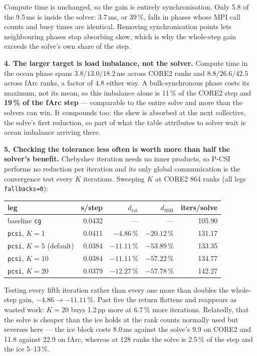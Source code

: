 \documentclass[10pt,a4paper]{article}
\begin{document}
\noindent
Compute time is unchanged, so the gain is entirely synchronisation. Only 5.8 of the 9.5\,ms
is inside the solver: 3.7\,ms, or 39\,\%, falls in phases whose MPI call counts and busy times
are identical. Removing synchronisation points lets neighbouring phases stop absorbing skew,
which is why the whole-step gain exceeds the solve's own share of the step.

\textbf{4. The larger target is load imbalance, not the solver.} Compute time in the ocean
phase spans $3.8/13.0/18.2$\,ms across CORE2 ranks and $8.8/26.6/42.5$ across fArc ranks, a
factor of $4.8$ either way. A bulk-synchronous phase costs its maximum, not its mean, so this
imbalance alone is 11\,\% of the CORE2 step and \textbf{19\,\% of the fArc step} --- comparable
to the entire solve and more than the solvers can win. It compounds too: the skew is absorbed
at the next collective, the solve's first reduction, so part of what the table attributes to
solver wait is ocean imbalance arriving there.

\textbf{5. Checking the tolerance less often is worth more than half the solver's benefit.}
Chebyshev iteration needs no inner products, so P-CSI performs no reduction per iteration and
its only global communication is the convergence test every $K$ iterations. Sweeping $K$ at
CORE2 864 ranks (all legs \texttt{fallbacks=0}):

\begin{center}\vspace{-5pt}\footnotesize
\begin{tabular}{lrrrr}
\toprule
leg & s/step & $d_{\mathrm{tot}}$ & $d_{\mathrm{SSH}}$ & iters/solve \\
\midrule
baseline \texttt{cg} & 0.0432 & --- & --- & 105.90 \\
\texttt{pcsi}, $K=1$  & 0.0411 & $-4.86$\,\% & $-20.12$\,\% & 131.17 \\
\texttt{pcsi}, $K=5$ (default) & 0.0384 & $\mathbf{-11.11}$\,\% & $-53.89$\,\% & 133.35 \\
\texttt{pcsi}, $K=10$ & 0.0384 & $-11.11$\,\% & $-57.22$\,\% & 134.77 \\
\texttt{pcsi}, $K=20$ & 0.0379 & $-12.27$\,\% & $-57.78$\,\% & 142.27 \\
\bottomrule
\end{tabular}\vspace{-5pt}
\end{center}

\noindent
Testing every fifth iteration rather than every one more than doubles the whole-step gain,
$-4.86 \to -11.11$\,\%. Past five the return flattens and reappears as wasted work: $K=20$
buys 1.2\,pp more at 6.7\,\% more iterations. Relatedly, that the solve is cheaper than the
ice holds at the rank counts normally used but reverses here --- the ice block costs 8.0\,ms
against the solve's 9.9 on CORE2 and 11.8 against 22.9 on fArc, whereas at 128 ranks the solve
is 2.5\,\% of the step and the ice 5--13\,\%.
\end{document}
